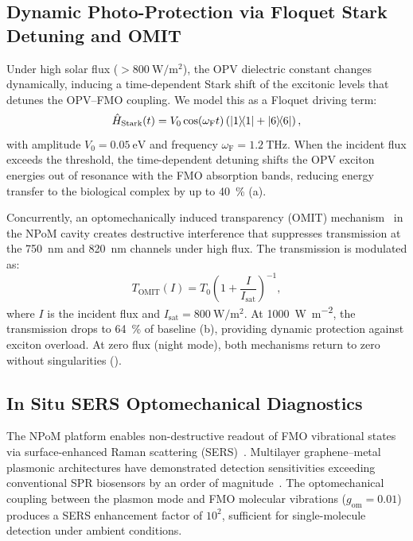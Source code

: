 \documentclass[twocolumn]{article}
\begin{document}
\subsection*{Dynamic Photo-Protection via Floquet Stark Detuning and OMIT}

Under high solar flux ($> \SI{800}{\W\per\m\squared}$), the OPV dielectric constant changes dynamically, inducing a time-dependent Stark shift of the excitonic levels that detunes the OPV--FMO coupling.
We model this as a Floquet driving term:
\begin{equation}
\hat{H}_{\mathrm{Stark}}(t) = V_0 \cos(\omega_{\mathrm{F}} t) \left( \dyad{1}{1} + \dyad{6}{6} \right),
\label{eq:stark_detuning}
\end{equation}
with amplitude $V_0 = \SI{0.05}{\eV}$ and frequency $\omega_{\mathrm{F}} = \SI{1.2}{\THz}$.
When the incident flux exceeds the threshold, the time-dependent detuning shifts the OPV exciton energies out of resonance with the FMO absorption bands, reducing energy transfer to the biological complex by up to \SI{40}{\percent} (a).

Concurrently, an optomechanically induced transparency (OMIT) mechanism~\cite{Aspelmeyer2014} in the NPoM cavity creates destructive interference that suppresses transmission at the \SI{750}{\nm} and \SI{820}{\nm} channels under high flux.
The transmission is modulated as:
\begin{equation}
T_{\mathrm{OMIT}}(I) = T_0 \left(1 + \frac{I}{I_{\mathrm{sat}}}\right)^{-1},
\label{eq:omit}
\end{equation}
where $I$ is the incident flux and $I_{\mathrm{sat}} = \SI{800}{\W\per\m\squared}$.
At \SI{1000}{\W\per\m\squared}, the transmission drops to \SI{64}{\percent} of baseline (b), providing dynamic protection against exciton overload.
At zero flux (night mode), both mechanisms return to zero without singularities ().

\subsection*{In Situ SERS Optomechanical Diagnostics}

The NPoM platform enables non-destructive readout of FMO vibrational states via surface-enhanced Raman scattering (SERS)~\cite{Langer2020}.
Multilayer graphene--metal plasmonic architectures have demonstrated detection sensitivities exceeding conventional SPR biosensors by an order of magnitude~\cite{Bahmani2026}.
The optomechanical coupling between the plasmon mode and FMO molecular vibrations ($g_{\mathrm{om}} = 0.01$) produces a SERS enhancement factor of $10^2$, sufficient for single-molecule detection under ambient conditions.
\end{document}
